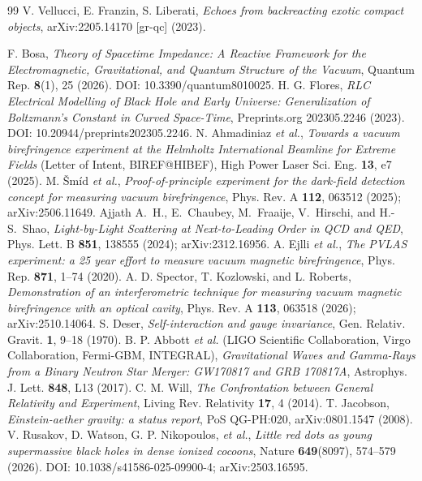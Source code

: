 \documentclass[11pt,a4paper]{article}
\theoremstyle{plain}
\theoremstyle{remark}
\begin{document}
\begin{thebibliography}{99}
 V. Vellucci, E. Franzin, S. Liberati, \textit{Echoes from backreacting exotic compact objects}, arXiv:2205.14170 [gr-qc] (2023).

 F. Bosa, \textit{Theory of Spacetime Impedance: A Reactive Framework for the Electromagnetic, Gravitational, and Quantum Structure of the Vacuum}, Quantum Rep. \textbf{8}(1), 25 (2026). DOI: 10.3390/quantum8010025.
 H. G. Flores, \textit{RLC Electrical Modelling of Black Hole and Early Universe: Generalization of Boltzmann's Constant in Curved Space-Time}, Preprints.org 202305.2246 (2023). DOI: 10.20944/preprints202305.2246.
 N. Ahmadiniaz \emph{et al.}, \emph{Towards a vacuum birefringence experiment at the Helmholtz International Beamline for Extreme Fields} (Letter of Intent, BIREF@HIBEF), High Power Laser Sci. Eng. \textbf{13}, e7 (2025).
 M. \v{S}m\'{i}d \emph{et al.}, \emph{Proof-of-principle experiment for the dark-field detection concept for measuring vacuum birefringence}, Phys. Rev. A \textbf{112}, 063512 (2025); arXiv:2506.11649.
 Ajjath A.~H., E.~Chaubey, M.~Fraaije, V.~Hirschi, and H.-S.~Shao, \emph{Light-by-Light Scattering at Next-to-Leading Order in QCD and QED}, Phys. Lett. B \textbf{851}, 138555 (2024); arXiv:2312.16956.
 A. Ejlli \emph{et al.}, \emph{The PVLAS experiment: a 25 year effort to measure vacuum magnetic birefringence}, Phys. Rep. \textbf{871}, 1--74 (2020).
 A. D. Spector, T. Kozlowski, and L. Roberts, \emph{Demonstration of an interferometric technique for measuring vacuum magnetic birefringence with an optical cavity}, Phys. Rev. A \textbf{113}, 063518 (2026); arXiv:2510.14064.
 S. Deser, \emph{Self-interaction and gauge invariance}, Gen. Relativ. Gravit. \textbf{1}, 9--18 (1970).
 B. P. Abbott \emph{et al.} (LIGO Scientific Collaboration, Virgo Collaboration, Fermi-GBM, INTEGRAL), \emph{Gravitational Waves and Gamma-Rays from a Binary Neutron Star Merger: GW170817 and GRB 170817A}, Astrophys. J. Lett. \textbf{848}, L13 (2017).
 C. M. Will, \emph{The Confrontation between General Relativity and Experiment}, Living Rev. Relativity \textbf{17}, 4 (2014).
 T. Jacobson, \emph{Einstein-aether gravity: a status report}, PoS QG-PH:020, arXiv:0801.1547 (2008).
 V. Rusakov, D. Watson, G. P. Nikopoulos, \emph{et al.}, \emph{Little red dots as young supermassive black holes in dense ionized cocoons}, Nature \textbf{649}(8097), 574--579 (2026). DOI: 10.1038/s41586-025-09900-4; arXiv:2503.16595.

\end{thebibliography}
\end{document}
